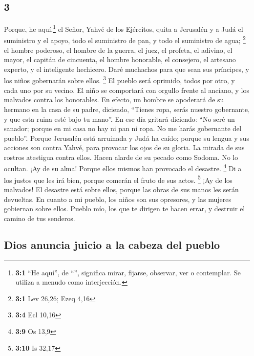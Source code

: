 \begin{paracol}{2}
\hypertarget{section-4}{%
\section{3}\label{section-4}}

 Porque, he aquí,\footnote{\textbf{3:1} ``He aquí'', de
  ``'', significa mirar, fijarse, observar, ver o
  contemplar. Se utiliza a menudo como interjección.} el Señor, Yahvé de
los Ejércitos, quita a Jerusalén y a Judá el suministro y el apoyo, todo
el suministro de pan, y todo el suministro de agua; \footnote{\textbf{3:1}
  Lev 26,26; Ezeq 4,16}  el hombre poderoso, el hombre de
la guerra, el juez, el profeta, el adivino, el mayor,  el
capitán de cincuenta, el hombre honorable, el consejero, el artesano
experto, y el inteligente hechicero.  Daré muchachos para
que sean sus príncipes, y los niños gobernarán sobre ellos. \footnote{\textbf{3:4}
  Ecl 10,16}  El pueblo será oprimido, todos por otro, y
cada uno por su vecino. El niño se comportará con orgullo frente al
anciano, y los malvados contra los honorables.  En efecto,
un hombre se apoderará de su hermano en la casa de su padre, diciendo,
``Tienes ropa, serás nuestro gobernante, y que esta ruina esté bajo tu
mano''.  En ese día gritará diciendo: ``No seré un
sanador; porque en mi casa no hay ni pan ni ropa. No me harás gobernante
del pueblo''.  Porque Jerusalén está arruinada y Judá ha
caído; porque su lengua y sus acciones son contra Yahvé, para provocar
los ojos de su gloria.  La mirada de sus rostros atestigua
contra ellos. Hacen alarde de su pecado como Sodoma. No lo ocultan. ¡Ay
de su alma! Porque ellos mismos han provocado el desastre. \footnote{\textbf{3:9}
  Os 13,9}  Di a los justos que les irá bien, porque
comerán el fruto de sus actos. \footnote{\textbf{3:10} Is 32,17}
 ¡Ay de los malvados! El desastre está sobre ellos,
porque las obras de sus manos les serán devueltas.  En
cuanto a mi pueblo, los niños son sus opresores, y las mujeres gobiernan
sobre ellos. Pueblo mío, los que te dirigen te hacen errar, y destruir
el camino de tus senderos.

\hypertarget{dios-anuncia-juicio-a-la-cabeza-del-pueblo}{%
\subsection{Dios anuncia juicio a la cabeza del
pueblo}\label{dios-anuncia-juicio-a-la-cabeza-del-pueblo}}


\end{paracol}
